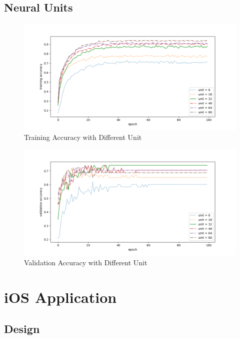 \documentclass{article}
\begin{document}
\subsection{Neural Units}


\begin{figure}[h]
\centering
\includegraphics[scale=0.5]{DataAnalysis/TrainingAccuracyUnit.png}
\caption{Training Accuracy with Different Unit}
\label{fig:Training Accuracy with Different Unit}
\end{figure}

\begin{figure}[h]
\centering
\includegraphics[scale=0.5]{DataAnalysis/ValidationAccuracyUnit.png}
\caption{Validation Accuracy with Different Unit}
\label{fig:Validation Accuracy with Different Unit}
\end{figure}










\section{iOS Application}

\subsection{Design}
\end{document}
